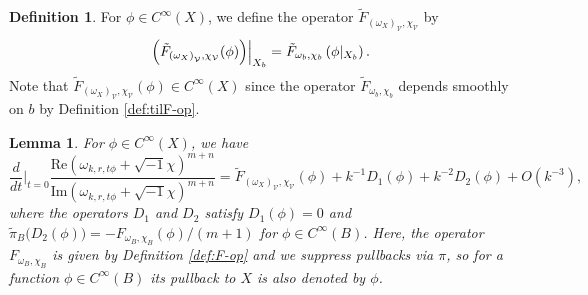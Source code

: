\documentclass{amsart}
\numberwithin{equation}{section}
\theoremstyle{plain}
\newtheorem{lemma}[equation]{Lemma}
\theoremstyle{definition}
\newtheorem{definition}[equation]{Definition}
\theoremstyle{remark}
\begin{document}
\begin{definition}
For $\phi \in C^\infty(X)$, we define the operator $\tilde{F}_{ \left( \omega_X \right)_\mathcal{V}, \chi_\mathcal{V}}$ by 
$$\Bigl( \tilde{F}_{ \left( \omega_X \right)_\mathcal{V}, \chi_\mathcal{V}} (\phi) \Bigr) \Big\vert_{X_b} = \tilde{F}_{ \omega_b, \chi_b} \left( \phi\vert_{X_b} \right).$$
Note that $\tilde{F}_{ \left( \omega_X \right)_\mathcal{V}, \chi_\mathcal{V}} (\phi)\in C^\infty(X)$ since the operator $\tilde{F}_{\omega_b,\chi_b}$ depends smoothly on $b$ by Definition \ref{def:tilF-op}.
\end{definition}

\begin{lemma}
 For $\phi \in C^\infty(X)$, we have
$$\frac{d}{dt}\Big|_{t = 0}\frac{\mathrm{Re}(\omega_{k,r,t\phi}+\sqrt{-1}\chi)^{m+n}}{\mathrm{Im}(\omega_{k,r,t\phi}+\sqrt{-1}\chi)^{m+n}}
= \tilde{F}_{ \left( \omega_X \right)_\mathcal{V}, \chi_\mathcal{V}} \left(\phi \right) + k^{-1}D_1(\phi) + k^{-2}D_2(\phi)+O(k^{-3}),$$
where the operators $D_1$ and $D_2$ satisfy $D_1(\phi)=0$ and $\tilde{\pi}_B\bigl(D_2(\phi)\bigr)=-F_{\omega_B,\chi_B}(\phi)/(m+1)$ for $\phi\in C^\infty(B)$. Here, the operator $F_{\omega_B,\chi_B}$ is given by Definition \ref{def:F-op} and we suppress pullbacks via $\pi$,
so for a function $\phi\in C^\infty(B)$ its pullback to $X$ is also denoted by $\phi$.
\end{lemma}
\end{document}
